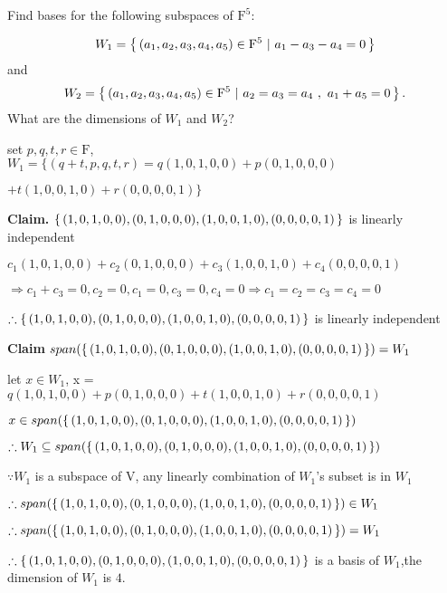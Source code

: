 Find bases for the following subspaces of $\mathrm{F}^5$:

$$ W_1 = \left\{ \,(a_1,a_2,a_3,a_4,a_5) \in \mathrm{F}^5 ~|~ a_1 - a_3 - a_4 = 0 \,\right\} $$
and
$$ W_2 = \left\{ \,(a_1,a_2,a_3,a_4,a_5) \in \mathrm{F}^5 ~|~ a_2 = a_3 = a_4 ~,~ a_1 + a_5 = 0 \,\right\}. $$
What are the dimensions of $W_1$ and $W_2$?


\begin{tcolorbox}
	\begin{solution}
		set $p,q,t,r \in \mathrm{F}$,\\$W_1 = \{(q+t,p,q,t,r) = q(1,0,1,0,0)+ p(0,1,0,0,0) $
		
		$ + t(1,0,0,1,0) + r(0,0,0,0,1)\}$
		
		\textbf{Claim.} $\left\{ \,(1,0,1,0,0),(0,1,0,0,0),(1,0,0,1,0),(0,0,0,0,1) \,\right\}$ is linearly independent
		
		$c_1(1,0,1,0,0) + c_2(0,1,0,0,0) + c_3(1,0,0,1,0)+c_4(0,0,0,0,1)$
		
		$\Rightarrow c_1+c_3=0, c_2 = 0, c_1 = 0, c_3 = 0, c_4 = 0 \Rightarrow c_1=c_2=c_3=c_4=0$
		
		$\therefore \left\{ \,(1,0,1,0,0),(0,1,0,0,0),(1,0,0,1,0),(0,0,0,0,1) \,\right\}$ is linearly independent
		
		\textbf{Claim} $span(\left\{ \,(1,0,1,0,0),(0,1,0,0,0),(1,0,0,1,0),(0,0,0,0,1) \,\right\}) = W_1$	
			
		let $x \in W_1$, x = $q(1,0,1,0,0) + p(0,1,0,0,0) + t(1,0,0,1,0)+r(0,0,0,0,1)$
		
		$x \in span(\left\{ \,(1,0,1,0,0),(0,1,0,0,0),(1,0,0,1,0),(0,0,0,0,1) \,\right\})$
		
		$\therefore W_1 \subseteq span(\left\{ \,(1,0,1,0,0),(0,1,0,0,0),(1,0,0,1,0),(0,0,0,0,1) \,\right\})$
		
		$\because W_1$ is a subspace of V, any linearly combination of $W_1$'s subset is in $W_1$
		
		$\therefore span(\left\{ \,(1,0,1,0,0),(0,1,0,0,0),(1,0,0,1,0),(0,0,0,0,1) \,\right\}) \in W_1$
		
		$\therefore span(\left\{ \,(1,0,1,0,0),(0,1,0,0,0),(1,0,0,1,0),(0,0,0,0,1) \,\right\}) = W_1$
		
		$\therefore \left\{ \,(1,0,1,0,0),(0,1,0,0,0),(1,0,0,1,0),(0,0,0,0,1) \,\right\}$ is a basis of $W_1$,the dimension of $W_1$ is $4$.
	\end{solution}
\end{tcolorbox}